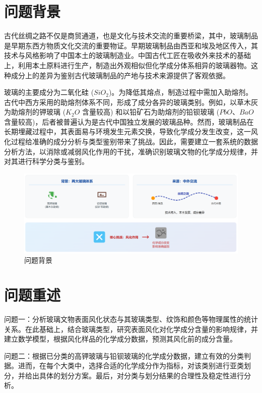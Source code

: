 \section{问题背景}

古代丝绸之路不仅是商贸通道，也是文化与技术交流的重要桥梁，其中，玻璃制品是早期东西方物质文化交流的重要物证。早期玻璃制品由西亚和埃及地区传入，其技术与风格影响了中国本土的玻璃制造业。中国古代工匠在吸收外来技术的基础上，利用本土原料进行生产，制造出外观相似但化学成分体系相异的玻璃器物。这种成分上的差异为鉴别古代玻璃制品的产地与技术来源提供了客观依据。

玻璃的主要成分为二氧化硅 ($SiO_2$)。为降低其熔点，制造过程中需加入助熔剂。古代中西方采用的助熔剂体系不同，形成了成分各异的玻璃类别。例如，以草木灰为助熔剂的钾玻璃 ($K_2O$ 含量较高) 和以铅矿石为助熔剂的铅钡玻璃 ($PbO$、$BaO$ 含量较高)，后者被普遍认为是古代中国独立发展的玻璃品种。然而，玻璃制品在长期埋藏过程中，其表面易与环境发生元素交换，导致化学成分发生改变，这一风化过程给准确的成分分析与类型鉴别带来了挑战。因此，需要建立一套系统的数据分析方法，以消除或减弱风化作用的干扰，准确识别玻璃文物的化学成分规律，并对其进行科学分类与鉴别。


\begin{figure}[htbp]
    \centering
    \includegraphics[width=\textwidth]{figs/1前置/问题背景.png}
    \caption{问题背景} 
    \label{fig:your_image_label} 
\end{figure}


\section{问题重述}

问题一：分析玻璃文物表面风化状态与其玻璃类型、纹饰和颜色等物理属性的统计关系。在此基础上，结合玻璃类型，研究表面风化对化学成分含量的影响规律，并建立数学模型，根据风化样品的化学成分数据，预测其风化前的成分含量。

问题二：根据已分类的高钾玻璃与铅钡玻璃的化学成分数据，建立有效的分类判据。进而，在每个大类中，选择合适的化学成分作为指标，对该类别进行亚类划分，并给出具体的划分方案。最后，对分类与划分结果的合理性及稳定性进行分析。

